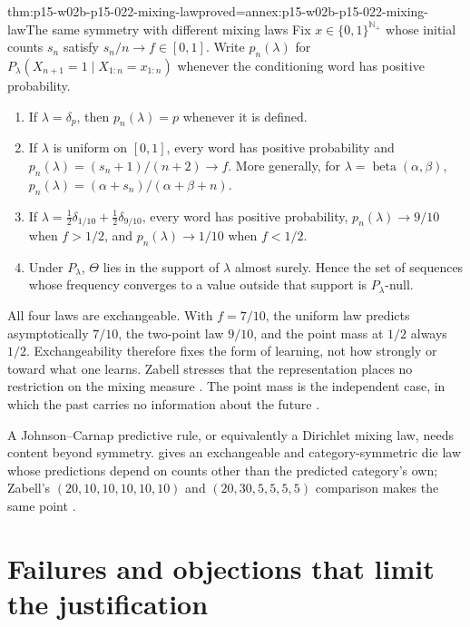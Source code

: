 \begin{hbtheorem}{thm:p15-w02b-p15-022-mixing-law}{proved=annex:p15-w02b-p15-022-mixing-law}{The same symmetry with different mixing laws}
Fix \(x\in\{0,1\}^{\mathbb N_+}\) whose initial counts \(s_n\) satisfy
\(s_n/n\to f\in[0,1]\). Write \(p_n(\lambda)\) for
\(P_\lambda(X_{n+1}=1\mid X_{1:n}=x_{1:n})\) whenever the conditioning word
has positive probability.
\begin{enumerate}
\item If \(\lambda=\delta_p\), then \(p_n(\lambda)=p\) whenever it is defined.
\item If \(\lambda\) is uniform on \([0,1]\), every word has positive
      probability and \(p_n(\lambda)=(s_n+1)/(n+2)\to f\). More generally,
      for \(\lambda=\operatorname{beta}(\alpha,\beta)\),
      \(p_n(\lambda)=(\alpha+s_n)/(\alpha+\beta+n)\).
\item If \(\lambda=\frac12\delta_{1/10}+\frac12\delta_{9/10}\), every word has
      positive probability, \(p_n(\lambda)\to9/10\) when \(f>1/2\), and
      \(p_n(\lambda)\to1/10\) when \(f<1/2\).
\item Under \(P_\lambda\), \(\Theta\) lies in the support of \(\lambda\)
      almost surely. Hence the set of sequences whose frequency converges
      to a value outside that support is \(P_\lambda\)-null.
\end{enumerate}
\end{hbtheorem}

All four laws are exchangeable. With \(f=7/10\), the uniform law predicts
asymptotically \(7/10\), the two-point law \(9/10\), and the point mass at
\(1/2\) always \(1/2\). Exchangeability therefore fixes the form of
learning, not how strongly or toward what one learns. Zabell stresses that
the representation places no restriction on the mixing measure
\cite[pp.~275--276]{Zabell2011CarnapInductiveInference}. The point mass is
the independent case, in which the past carries no information about the
future \cite[p.~282]{Zabell2011CarnapInductiveInference}.

A Johnson--Carnap predictive rule, or equivalently a Dirichlet mixing law,
needs content beyond symmetry.  gives an
exchangeable and category-symmetric die law whose predictions depend on
counts other than the predicted category's own; Zabell's
\((20,10,10,10,10,10)\) and \((20,30,5,5,5,5)\) comparison makes the same
point \cite[pp.~280--281]{Zabell2011CarnapInductiveInference}.

\section{Failures and objections that limit the justification}
\label{sec:p15-w02b-p15-022-limits}

